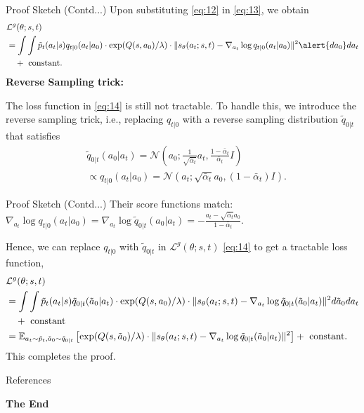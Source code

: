 \documentclass[aspectratio=169,xcolor=dvipsnames]{beamer}
\newcommand{\bE}{\mathbb{E}}
\newcommand{\cL}{\mathcal{L}}
\newcommand{\lm}{\lambda}
\newcommand{\te}{\theta}
\newcommand{\nal}[1]{\begin{align*}#1\end{align*}}
\newcommand{\al}[1]{\begin{align}#1\end{align}}
\newcommand{\cN}{\mathcal{N}}
\begin{document}
\begin{frame}{Proof Sketch (Contd...)}
    Upon substituting \eqref{eq:12} in \eqref{eq:13}, we obtain
    \al{
        &\cL^{g}(\te;s,t) \label{eq:14}\\
        & = \int\int \tilde{p}_t(a_t|s) q_{t|0}(a_t|a_0)\cdot \exp(Q(s,a_0)/\lm)\cdot \|s_{\te}(a_t;s,t)-\nabla_{a_t}\log q_{t|0}(a_t|a_0)\|^2 \alert{da_0} da_t \notag\\
        & \quad + \text{ constant}. \notag
    }
    \textbf{Reverse Sampling trick:}

    The loss function in \eqref{eq:14} is still not tractable. To handle this, we introduce
 the reverse sampling trick, i.e., replacing $q_{t|0}$ with a reverse sampling distribution $\tilde{q}_{0|t}$ that satisfies
 \nal{
    & \tilde{q}_{0|t}(a_0|a_t) = \cN\left(a_0;\frac{1}{\sqrt{\bar{\alpha}_t}}a_t,\frac{1-\bar{\alpha}_t}{\bar{\alpha}_t}I\right)\\
    & \propto  q_{t|0}(a_t|a_0) = \cN(a_t;\sqrt{\bar{\alpha}_t}a_0,(1-\bar{\alpha}_t)I).
 }
\end{frame}
\begin{frame}{Proof Sketch (Contd...)}
    Their score functions match: $\nabla_{a_t}\log q_{t|0}(a_t|a_0) = \nabla_{a_t}\log \tilde{q}_{0|t}(a_0|a_t) = -\frac{a_t-\sqrt{\bar{\alpha}_t}a_0}{1-\bar{\alpha}_t}$.

    Hence, we can replace $q_{t|0}$ with $\tilde{q}_{0|t}$ in $\cL^{g}(\te;s,t)$ \eqref{eq:14} to get a tractable loss function,
    \al{
        &\cL^{g}(\te;s,t) \label{eq:15}\\
        & = \int\int \tilde{p}_t(a_t|s) \tilde{q}_{0|t}(\tilde{a}_0|a_t)\cdot \exp(Q(s,a_0)/\lm)\cdot \|s_{\te}(a_t;s,t)-\nabla_{a_t}\log \tilde{q}_{0|t}(\tilde{a}_0|a_t)\|^2 d\tilde{a}_0 da_t \notag\\
        & \quad + \text{ constant} \notag\\
        & = \bE_{a_t\sim \tilde{p}_t, \tilde{a}_0\sim \tilde{q}_{0|t}}\left[\exp(Q(s,\tilde{a}_0)/\lm)\cdot\|s_{\te}(a_t;s,t)-\nabla_{a_t}\log \tilde{q}_{0|t}(\tilde{a}_0|a_t)\|^2\right]+\text{ constant}.\notag
    }
    This completes the proof. 
\end{frame}



\begin{frame}{References}
    \footnotesize
    
    
\end{frame}


\begin{frame}
    \Huge{\centerline{\textbf{The End}}}
\end{frame}

\end{document}
